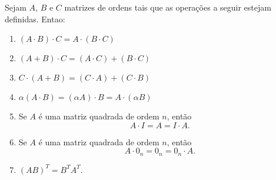 \begin{proposicao}
	Sejam $A$, $B$ e $C$ matrizes de ordens tais que as operações a seguir estejam definidas. Entao:
	\begin{enumerate}[label={\roman*})]
		\item $(A\cdot B)\cdot C = A\cdot(B \cdot C)$
		\item $(A + B)\cdot C = (A\cdot C) + (B\cdot C)$
		\item $C\cdot(A + B) = (C\cdot A) + (C\cdot B)$
		\item $\alpha(A\cdot B) = (\alpha A)\cdot B = A \cdot(\alpha B)$
		\item Se $A$ é uma matriz quadrada de ordem $n$, então
			\[A\cdot I = A = I\cdot A.\]
		\item Se $A$ é uma matriz quadrada de ordem $n$, então
			\[A\cdot0_n = 0_n = 0_n\cdot A.\]
		\item $(AB)^T = B^TA^T$.
	\end{enumerate}
\end{proposicao}
